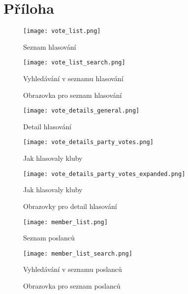 \chapter{Příloha}

\begin{figure}[h]
	\begin{minipage}{0.5\textwidth}
		\centering
		\texttt{[image: vote\_list.png]}
		\caption{Seznam hlasování}
		\label{fig:vote_list}
	\end{minipage}%
	\begin{minipage}{0.5\textwidth}
		\centering
		\texttt{[image: vote\_list\_search.png]}
		\caption{Vyhledávání v seznamu hlasování}
		\label{fig:vote_list_search}
	\end{minipage}
	\caption{Obrazovka pro seznam hlasování}
\end{figure}

\begin{figure}[h]
	\begin{minipage}{0.5\textwidth}
		\centering
		\texttt{[image: vote\_details\_general.png]}
		\caption{Detail hlasování}
		\label{fig:vote_details_general}
	\end{minipage}%
	\begin{minipage}{0.5\textwidth}
		\centering
		\texttt{[image: vote\_details\_party\_votes.png]}
		\caption{Jak hlasovaly kluby}
		\label{fig:vote_details_party_votes}
	\end{minipage}
	\begin{minipage}{0.5\textwidth}
	\centering
	\texttt{[image: vote\_details\_party\_votes\_expanded.png]}
	\caption{Jak hlasovaly kluby}
	\label{fig:vote_details_party_votes_expanded}
\end{minipage}
	\caption{Obrazovky pro detail hlasování}
\end{figure}

\begin{figure}[h]
	\begin{minipage}{0.5\textwidth}
		\centering
		\texttt{[image: member\_list.png]}
		\caption{Seznam poslanců}
		\label{fig:member_list}
	\end{minipage}%
	\begin{minipage}{0.5\textwidth}
		\centering
		\texttt{[image: member\_list\_search.png]}
		\caption{Vyhledávání v seznamu poslanců}
		\label{fig:member_list_search}
	\end{minipage}
	\caption{Obrazovka pro seznam poslanců}
\end{figure}

